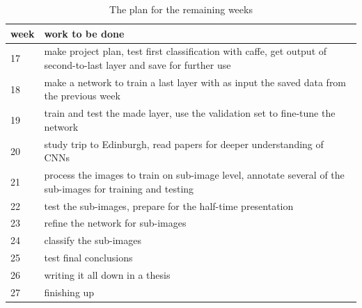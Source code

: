 \documentclass[a4paper, 11pt]{article}
\begin{document}
\begin{table}[h!tb]
\centering
\caption{The plan for the remaining weeks}
\label{tab:plan}
\begin{tabular}{|p{}|p{}|} \hline
week & work to be done \\ \hline \hline
17 & make project plan, test first classification with caffe, get output of second-to-last layer and save for further use\\ \hline
18 & make a network to train a last layer with as input the saved data from the previous week \\ \hline
19 & train and test the made layer, use the validation set to fine-tune the network \\ \hline
20 & study trip to Edinburgh, read papers for deeper understanding of CNNs \\ \hline
21 & process the images to train on sub-image level, annotate several of the sub-images for training and testing\\ \hline
22 & test the sub-images, prepare for the half-time presentation\\ \hline
23 & refine the network for sub-images\\ \hline
24 & classify the sub-images\\ \hline
25 & test final conclusions\\ \hline
26 & writing it all down in a thesis\\ \hline
27 & finishing up \\ \hline
\end{tabular}
\end{table}
\end{document}
